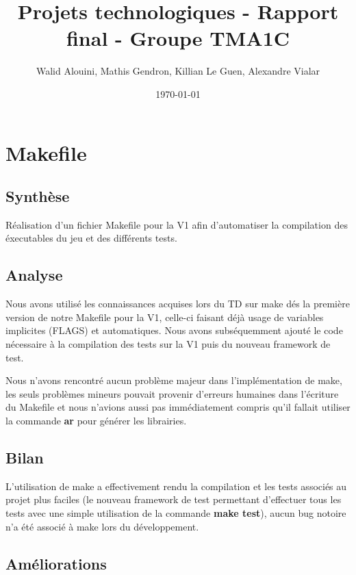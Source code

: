 \documentclass[12pt]{article}
\begin{document}
\title{Projets technologiques - Rapport final - Groupe TMA1C}
\author{Walid Alouini, Mathis Gendron, Killian Le Guen, Alexandre Vialar}
\date{\today}

\maketitle
\tableofcontents



\section{Makefile}
\subsection{Synthèse}

Réalisation d'un fichier Makefile pour la V1 afin d'automatiser la compilation des éxecutables du jeu et des différents tests.

\subsection{Analyse}

Nous avons utilisé les connaissances acquises lors du TD sur make dés la première version
de notre Makefile pour la V1, celle-ci faisant déjà usage de variables implicites (FLAGS) et automatiques.
Nous avons subséquemment ajouté le code nécessaire à la compilation des tests sur la V1 puis du nouveau
framework de test.

Nous n'avons rencontré aucun problème majeur dans l'implémentation de make, les seuls
problèmes mineurs pouvait provenir d'erreurs humaines dans l'écriture du Makefile et
nous n'avions aussi pas immédiatement compris qu'il fallait utiliser la commande \textbf{ar}
pour générer les librairies.

\subsection{Bilan}

L'utilisation de make a effectivement rendu la compilation et les tests associés au projet plus faciles 
(le nouveau framework de test permettant d'effectuer tous les tests avec une simple utilisation de la 
commande \textbf{make test}), aucun bug notoire n'a été associé à make lors du développement.

\subsection{Améliorations}
\end{document}
